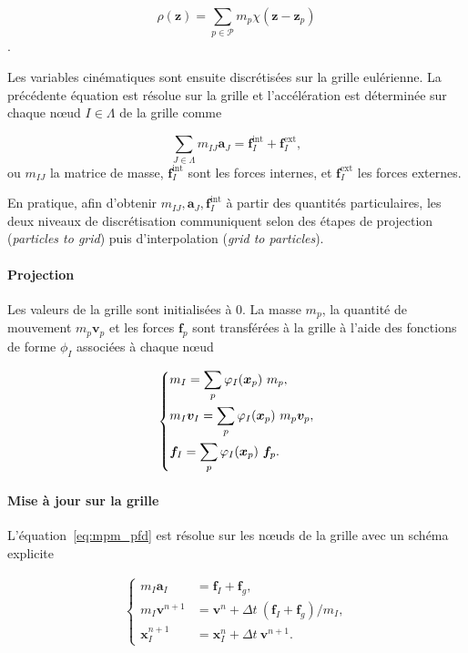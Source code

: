 \begin{equation*}
    \rho(\bm z) = \sum_{p \in \mathcal P} m_p \chi(\bm z - \bm z_p)
\end{equation*}.

Les variables cinématiques sont ensuite discrétisées sur la grille eulérienne. La précédente équation est résolue sur la grille et l'accélération est déterminée sur chaque nœud $I \in \Lambda$ de la grille comme

\begin{equation*}\label{eq:mpm_pfd}
    \sum_{J \in \Lambda} m_{IJ} \bm a_J = \bm f_I^{\text{int}} + \bm f_I^{\text{ext}},
\end{equation*}ou $m_{IJ}$ la matrice de masse, $\bm f_I^{\text{int}}$ sont les forces internes, et $\bm f_I^{\text{ext}}$ les forces externes.

En pratique, afin d'obtenir $m_{IJ},\bm a_J,\bm f_I^{\text{int}}$ à partir des quantités particulaires, les deux niveaux de discrétisation communiquent selon des étapes de projection (\textit{particles to grid}) puis d'interpolation (\textit{grid to particles}).

\paragraph*{Projection}

Les valeurs de la grille sont initialisées à 0. La masse $m_p$, la quantité de mouvement $m_p \bm v_p$ et les forces $\bm f_p$ sont transférées à la grille à l'aide des fonctions de forme $\phi_I$ associées à chaque nœud

\begin{gather*}
    \left\{\begin{aligned}
         & m_I = \sum_p \varphi_{I}(\bm{x}_p)~ m_p,                   \\
         & m_I \bm v_I  =  \sum_p \varphi_{I}(\bm{x}_p)~ m_p \bm v_p, \\
         & \bm f_I  =  \sum_p \varphi_{I}(\bm{x}_p)~\bm f_p.
    \end{aligned} \right.
\end{gather*}

\paragraph*{Mise à jour sur la grille}

L'équation~\ref{eq:mpm_pfd} est résolue sur les nœuds de la grille avec un schéma explicite

\begin{gather*}
    \left\{\begin{aligned}
        m_I \bm a_I     & =  \bm f_I + \bm f_g,                               \\
        m_I \bm v^{n+1} & =  \bm v^{n} + \Delta t~ (\bm f_I + \bm f_g) / m_I, \\
        \bm x_I^{n+1}   & =  \bm x_I^{n} + \Delta t~\bm v^{n+1}.
    \end{aligned} \right.
\end{gather*}

